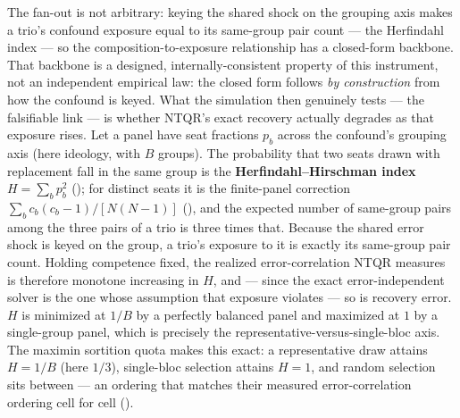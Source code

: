 \documentclass[
]{article}
\begin{document}
The fan-out is not arbitrary: keying the shared shock on the grouping
axis makes a trio's confound exposure equal to its same-group pair count
--- the Herfindahl index --- so the composition-to-exposure relationship
has a closed-form backbone. That backbone is a designed,
internally-consistent property of this instrument, not an independent
empirical law: the closed form follows \emph{by construction} from how
the confound is keyed. What the simulation then genuinely tests --- the
falsifiable link --- is whether NTQR's exact recovery actually degrades
as that exposure rises. Let a panel have seat fractions \(p_b\) across
the confound's grouping axis (here ideology, with \(B\) groups). The
probability that two seats drawn with replacement fall in the same group
is the \textbf{Herfindahl--Hirschman index} \(H = \sum_b p_b^2\)
(); for distinct seats it is the
finite-panel correction \(\sum_b c_b(c_b-1)/[N(N-1)]\)
(), and the expected
number of same-group pairs among the three pairs of a trio is three
times that. Because the shared error shock is keyed on the group, a
trio's exposure to it is exactly its same-group pair count. Holding
competence fixed, the realized error-correlation NTQR measures is
therefore monotone increasing in \(H\), and --- since the exact
error-independent solver is the one whose assumption that exposure
violates --- so is recovery error. \(H\) is minimized at \(1/B\) by a
perfectly balanced panel and maximized at \(1\) by a single-group panel,
which is precisely the representative-versus-single-bloc axis. The
maximin sortition quota makes this exact: a representative draw attains
\(H = 1/B\) (here \(1/3\)), single-bloc selection attains \(H = 1\), and
random selection sits between --- an ordering that matches their
measured error-correlation ordering cell for cell
().
\end{document}
